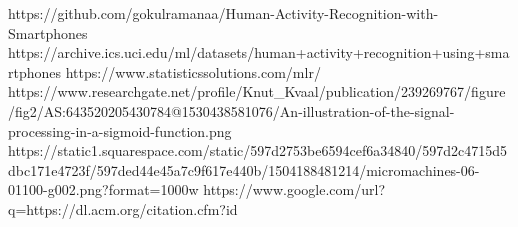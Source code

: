 \documentclass[12pt,a4paper]{report}
\begin{document}
\begin{thebibliography}{1}
		https://github.com/gokulramanaa/Human-Activity-Recognition-with-Smartphones
		https://archive.ics.uci.edu/ml/datasets/human+activity+recognition+using+smartphones
		https://www.statisticssolutions.com/mlr/		
		https://www.researchgate.net/profile/Knut\_Kvaal/publication/239269767/figure/fig2/AS:643520205430784@1530438581076/An-illustration-of-the-signal-processing-in-a-sigmoid-function.png
		https://static1.squarespace.com/static/597d2753be6594cef6a34840/597d2c4715d5dbc171e4723f/597ded44e45a7c9f617e440b/1504188481214/micromachines-06-01100-g002.png?format=1000w
		https://www.google.com/url?q=https://dl.acm.org/citation.cfm?id%
		
\end{thebibliography}
\end{document}
